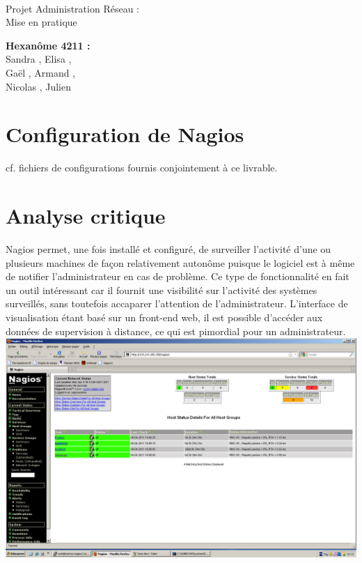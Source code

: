 \documentclass[a4paper]{article}
\begin{document}
\begin{titlepage}
	~ 
	\vfill
	\begin{center}
		\begin{Huge}
			Projet Administration Réseau : \\ Mise en pratique\\
		\end{Huge}
	\vfill
		\textbf{Hexanôme 4211 :} 
			\\Sandra {}, Elisa , 
			\\Gaël , Armand , 
			\\Nicolas {}, Julien \\
	\vfill
	\end{center}
	\vfill
\end{titlepage}


\section{Configuration de Nagios}

cf. fichiers de configurations fournis conjointement à ce livrable.

\section{Analyse critique}
Nagios permet, une fois installé et configuré, de surveiller l'activité d'une ou plusieurs machines de façon relativement autonôme puisque le logiciel est à même de notifier l'administrateur en cas de problème. Ce type de fonctionnalité en fait un outil intéressant car il fournit une visibilité sur l'activité des systèmes surveillés, sans toutefois accaparer l'attention de l'administrateur. L'interface de visualisation étant basé sur un front-end web, il est possible d'accéder aux données de supervision à distance, ce qui est pimordial pour un administrateur. ~\\

\includegraphics[width=\linewidth]{nagios-global.PNG}
\end{document}
